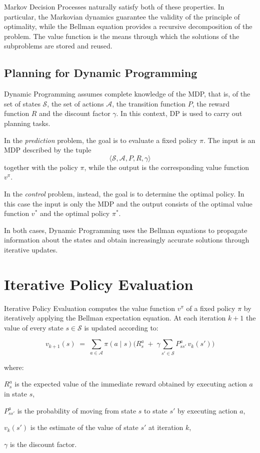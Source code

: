 Markov Decision Processes naturally satisfy both of these properties. In particular, the Markovian dynamics guarantee the validity of the principle of optimality, while the Bellman equation provides a recursive decomposition of the problem. The value function is the means through which the solutions of the subproblems are stored and reused.


\subsection{Planning for Dynamic Programming}

Dynamic Programming assumes complete knowledge of the MDP, that is, of the set of states $\mathcal{S}$, the set of actions $\mathcal{A}$, the transition function $P$, the reward function $R$ and the discount factor $\gamma$. In this context, DP is used to carry out planning tasks.

In the \emph{prediction} problem, the goal is to evaluate a fixed policy $\pi$. The input is an MDP described by the tuple
\[
\langle \mathcal{S}, \mathcal{A}, P, R, \gamma \rangle
\]
together with the policy $\pi$, while the output is the corresponding value function $v^\pi$.

In the \emph{control} problem, instead, the goal is to determine the optimal policy. In this case the input is only the MDP and the output consists of the optimal value function $v^*$ and the optimal policy $\pi^*$.

In both cases, Dynamic Programming uses the Bellman equations to propagate information about the states and obtain increasingly accurate solutions through iterative updates.


\section{Iterative Policy Evaluation}

Iterative Policy Evaluation computes the value function $v^\pi$ of a fixed policy $\pi$ by iteratively applying the Bellman expectation equation. At each iteration $k+1$ the value of every state $s \in \mathcal{S}$ is updated according to:

\[
v_{k+1}(s) \;=\; \sum_{a \in \mathcal{A}} \pi(a \mid s)
\Bigg( R_s^a \;+\; \gamma \sum_{s' \in \mathcal{S}} P_{ss'}^a \, v_k(s') \Bigg)
\]

where:
\begin{compactitemize}
    \item $R_s^a$ is the expected value of the immediate reward obtained by executing action $a$ in state $s$,
    \item $P_{ss'}^a$ is the probability of moving from state $s$ to state $s'$ by executing action $a$,
    \item $v_k(s')$ is the estimate of the value of state $s'$ at iteration $k$,
    \item $\gamma$ is the discount factor.
\end{compactitemize}

